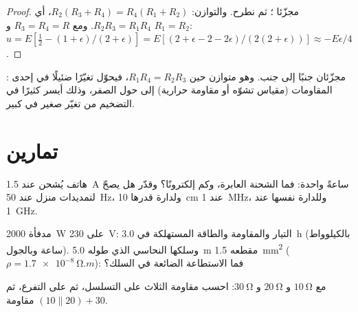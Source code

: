 \begin{proof}
مجزّئا ؛ ثم نطرح. والتوازن: $R_2(R_3 + R_4) = R_4(R_1 +
R_2)$، أي $R_2R_3 = R_1R_4$. ومع $R_3 = R_4 = R$ و $R_1 = R_2$:
$u = E[\tfrac12 - (1 + \epsilon)/(2 + \epsilon)] = E[(2 + \epsilon - 2 -
2\epsilon)/(2(2 + \epsilon))] \approx -E\epsilon/4$.
\end{proof}

\begin{omfigure}

{\small {}: مجزّئان جنبًا إلى جنب. وهو متوازن حين
$R_1R_4 = R_2R_3$، فيحوّل تغيّرًا ضئيلًا في إحدى المقاومات
(مقياس تشوّه أو مقاومة حرارية) إلى  حول الصفر، وذلك أيسر
كثيرًا في التضخيم من تغيّر صغير في  كبير.}
\end{omfigure}

\section{تمارين}

\begin{exercise}[$\star$]\label{exo:b1:dc-circuits:1}
هاتف يُشحن عند \qty{1.5}{A} ساعةً واحدة: فما الشحنة العابرة، وكم
إلكترونًا؟ وقدّر هل يصحّ  لتمديدات
منزل عند \qty{50}{Hz}، ولدارة قدرها \qty{10}{cm} عند \qty{1}{MHz}،
وللدارة نفسها عند \qty{1}{GHz}.
\end{exercise}

\begin{exercise}[$\star$]\label{exo:b1:dc-circuits:2}
مدفأة \qty{2000}{W} على \qty{230}{V}: التيار والمقاومة والطاقة
المستهلكة في \qty{3.0}{h} (بالكيلوواط ساعة وبالجول). وسلكها النحاسي الذي طوله \qty{5.0}{m}
مقطعه \qty{1.5}{mm^2} ($\rho = \qty{1.7e-8}{\ohm.m}$):
فما الاستطاعة الضائعة في السلك؟
\end{exercise}

\begin{exercise}[$\star$]\label{exo:b1:dc-circuits:3}
مع $\qty{10}{\ohm}$ و $\qty{20}{\ohm}$ و $\qty{30}{\ohm}$: احسب
مقاومة الثلاث على التسلسل، ثم على التفرع، ثم مقاومة
$(10 \parallel 20) + 30$.
\end{exercise}

